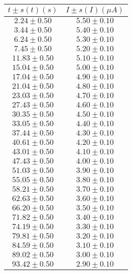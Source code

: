 \documentclass[12pt, letterpaper]{article} %
\theoremstyle{plain} %
\begin{document}
\vspace*{-3cm}
\begin{figure}[H]
\centering
\footnotesize
\begin{minipage}[t]{0.48\textwidth}
\centering
\begin{minipage}[t]{\linewidth}
\centering
\setlength{\arrayrulewidth}{1.2pt}
\begin{tabular}{|c|c|}
\hline
$t \pm s(t) (s)$ & $I \pm s(I) (\mu A)$ \\
\hline
$2.24 \pm 0.50$ & $5.50 \pm 0.10$ \\
$3.44 \pm 0.50$ & $5.40 \pm 0.10$ \\
$6.24 \pm 0.50$ & $5.30 \pm 0.10$ \\
$7.45 \pm 0.50$ & $5.20 \pm 0.10$ \\
$11.83 \pm 0.50$ & $5.10 \pm 0.10$ \\
$15.04 \pm 0.50$ & $5.00 \pm 0.10$ \\
$17.04 \pm 0.50$ & $4.90 \pm 0.10$ \\
$21.04 \pm 0.50$ & $4.80 \pm 0.10$ \\
$23.03 \pm 0.50$ & $4.70 \pm 0.10$ \\
$27.43 \pm 0.50$ & $4.60 \pm 0.10$ \\
$30.35 \pm 0.50$ & $4.50 \pm 0.10$ \\
$33.05 \pm 0.50$ & $4.40 \pm 0.10$ \\
$37.44 \pm 0.50$ & $4.30 \pm 0.10$ \\
$40.61 \pm 0.50$ & $4.20 \pm 0.10$ \\
$43.01 \pm 0.50$ & $4.10 \pm 0.10$ \\
$47.43 \pm 0.50$ & $4.00 \pm 0.10$ \\
$51.03 \pm 0.50$ & $3.90 \pm 0.10$ \\
$55.05 \pm 0.50$ & $3.80 \pm 0.10$ \\
$58.21 \pm 0.50$ & $3.70 \pm 0.10$ \\
$62.63 \pm 0.50$ & $3.60 \pm 0.10$ \\
$66.20 \pm 0.50$ & $3.50 \pm 0.10$ \\
$71.82 \pm 0.50$ & $3.40 \pm 0.10$ \\
$74.19 \pm 0.50$ & $3.30 \pm 0.10$ \\
$79.81 \pm 0.50$ & $3.20 \pm 0.10$ \\
$84.59 \pm 0.50$ & $3.10 \pm 0.10$ \\
$89.02 \pm 0.50$ & $3.00 \pm 0.10$ \\
$93.42 \pm 0.50$ & $2.90 \pm 0.10$ \\

\end{tabular}
\end{minipage}
\end{minipage}
\end{figure}
\end{document}
